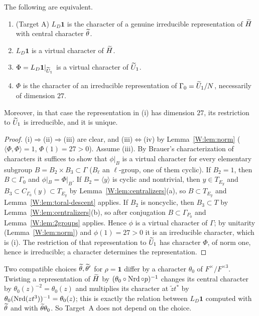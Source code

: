 \begin{theorem}\label{W:thm:reduction}
The following are equivalent.
\begin{enumerate}[label=(\roman*)]
\item (Target A) $L_D\mathbf1$ is the character of a genuine irreducible
representation of $\widetilde H$ with central character $\widetilde\theta$.
\item $L_D\mathbf1$ is a virtual character of $\widetilde H$.
\item $\Phi=L_D\mathbf1|_{\widetilde U_1}$ is a virtual character of $\widetilde U_1$.
\item $\Phi$ is the character of an irreducible representation of
$\Gamma_0=\widetilde U_1/N$, necessarily of dimension $27$.
\end{enumerate}
Moreover, in that case the representation in (i) has dimension $27$,
its restriction to $\widetilde U_1$ is irreducible, and it is unique.
\end{theorem}
\begin{proof}
(i)$\Rightarrow$(ii)$\Rightarrow$(iii) are clear, and (iii)$\Leftrightarrow$(iv)
by Lemma~\ref{W:lem:norm} ($\langle\Phi,\Phi\rangle=1$, $\Phi(1)=27>0$).
Assume (iii).  By Brauer's characterization of characters it suffices
to show that $\phi|_B$ is a virtual character for every elementary
subgroup $B=B_2\times B_3\subset\Gamma$ ($B_\ell$ an $\ell$-group, one
of them cyclic).  If $B_2=1$, then $B\subset\Gamma_0$ and $\phi|_B=\Phi|_B$.
If $B_2=\langle y\rangle$ is cyclic and nontrivial, then $y\in T_{E_y}$
and $B_3\subset C_{\Gamma_0}(y)\subset T_{E_y}$ by Lemma~\ref{W:lem:centralizers}(a),
so $B\subset T_{E_y}$ and Lemma~\ref{W:lem:toral-descent} applies.  If
$B_2$ is noncyclic, then $B_3\subset T$ by Lemma~\ref{W:lem:centralizers}(b),
so after conjugation $B\subset\Gamma_{P_0}$ and Lemma~\ref{W:lem:2groups}
applies.  Hence $\phi$ is a virtual character of $\Gamma$; by unitarity
(Lemma~\ref{W:lem:norm}) and $\phi(1)=27>0$ it is an irreducible
character, which is (i).  The restriction of that representation to
$\widetilde U_1$ has character $\Phi$, of norm one, hence is irreducible; a
character determines the representation.
\end{proof}

\begin{remark}\label{W:rem:theta-independence}
Two compatible choices $\widetilde\theta,\widetilde\theta'$ for $\rho=\mathbf1$ differ by a
character $\theta_0$ of $F^\times/F^{\times3}$.  Twisting a
representation of $\widetilde H$ by $(\theta_0\circ\operatorname{Nrd}\circ p)^{-1}$ changes
its central character by $\theta_0(z)^{-2}=\theta_0(z)$ and multiplies
its character at $\tilde zt^*$ by $\theta_0(\operatorname{Nrd}(zt^3))^{-1}=\theta_0(z)$;
this is exactly the relation between $L_D\mathbf1$ computed with
$\widetilde\theta$ and with $\widetilde\theta\theta_0$.  So Target~A does not depend on the
choice.
\end{remark}

